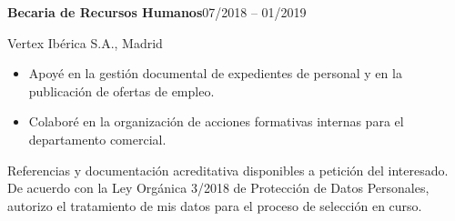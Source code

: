 \documentclass[10pt,a4paper]{article}
\newcommand{\jobtitle}[2]{%
  \textbf{\color{ink}#1}\hfill{\small\color{muted}#2}\par
}
\begin{document}
\begin{minipage}[t]{0.615\textwidth}
\jobtitle{Becaria de Recursos Humanos}{07/2018 -- 01/2019}
{\small\color{primary} Vertex Ib\'erica S.A., Madrid}
\begin{itemize}[leftmargin=14pt,itemsep=1pt,topsep=3pt,parsep=0pt]
\item Apoy\'e en la gesti\'on documental de expedientes de personal y en la
publicaci\'on de ofertas de empleo.
\item Colabor\'e en la organizaci\'on de acciones formativas internas para el
departamento comercial.
\end{itemize}

\vspace{8pt}
{\footnotesize\color{muted}\RaggedRight
Referencias y documentaci\'on acreditativa disponibles a petici\'on del interesado.
De acuerdo con la Ley Org\'anica 3/2018 de Protecci\'on de Datos Personales, autorizo
el tratamiento de mis datos para el proceso de selecci\'on en curso.\par}

\end{minipage}
\end{document}
